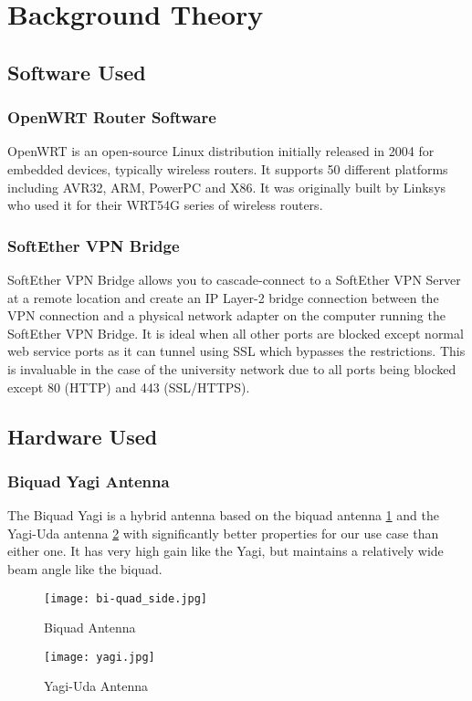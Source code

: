 \section{Background Theory}

\subsection{Software Used}
\subsubsection{OpenWRT Router Software}
OpenWRT is an open-source Linux distribution initially released in 2004 for embedded devices, typically wireless routers. It supports 50 different platforms including AVR32, ARM, PowerPC and X86. It was originally built by Linksys who used it for their WRT54G series of wireless routers.

\subsubsection{SoftEther VPN Bridge}
\label{sec:comms_theory_vpn} %
SoftEther VPN Bridge allows you to cascade-connect to a SoftEther VPN Server at a remote location and create an IP Layer-2 bridge connection between the VPN connection and a physical network adapter on the computer running the SoftEther VPN Bridge. It is ideal when all other ports are blocked except normal web service ports as it can tunnel using SSL which bypasses the restrictions. This is invaluable in the case of the university network due to all ports being blocked except 80 (HTTP) and 443 (SSL/HTTPS).

\subsection{Hardware Used}
\subsubsection{Biquad Yagi Antenna}
The Biquad Yagi is a hybrid antenna based on the biquad antenna \ref{fig:biquad} and the Yagi-Uda antenna \ref{fig:yagi} with significantly better properties for our use case than either one. It has very high gain like the Yagi, but maintains a relatively wide beam angle like the biquad. 

\begin{figure}[!htb]
\begin{center}
\texttt{[image: bi-quad\_side.jpg]}
\end{center}
\caption{Biquad Antenna}
\label{fig:biquad}
\end{figure}

\begin{figure}[!htb]
\begin{center}
\texttt{[image: yagi.jpg]}
\end{center}
\caption{Yagi-Uda Antenna}
\label{fig:yagi}
\end{figure}

